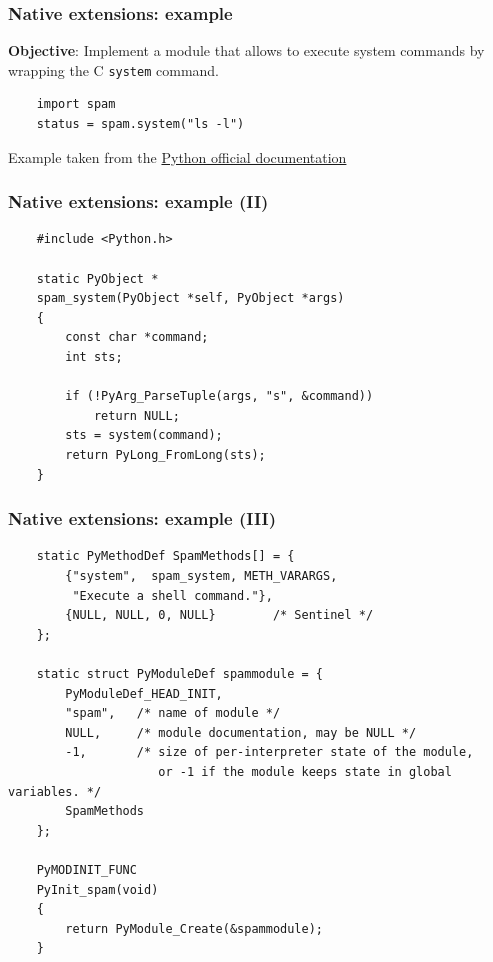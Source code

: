 \documentclass{beamer}
\begin{document}
\begin{frame}[fragile]
  \frametitle{Native extensions: example}

  \textbf{Objective}: Implement a module that allows to execute system commands
  by wrapping the C \texttt{system} command.

  \begin{verbatim}
    import spam
    status = spam.system("ls -l")
  \end{verbatim}

  \tiny Example taken from the
  \href{https://docs.python.org/3/extending/extending.html#a-simple-example}{Python
  official documentation}
\end{frame}

\begin{frame}[fragile]
  \frametitle{Native extensions: example (II)}

  \begin{verbatim}
    #include <Python.h>

    static PyObject *
    spam_system(PyObject *self, PyObject *args)
    {
        const char *command;
        int sts;

        if (!PyArg_ParseTuple(args, "s", &command))
            return NULL;
        sts = system(command);
        return PyLong_FromLong(sts);
    }
  \end{verbatim}
\end{frame}

\begin{frame}[fragile]
  \frametitle{Native extensions: example (III)}

  \begin{verbatim}
    static PyMethodDef SpamMethods[] = {
        {"system",  spam_system, METH_VARARGS,
         "Execute a shell command."},
        {NULL, NULL, 0, NULL}        /* Sentinel */
    };

    static struct PyModuleDef spammodule = {
        PyModuleDef_HEAD_INIT,
        "spam",   /* name of module */
        NULL,     /* module documentation, may be NULL */
        -1,       /* size of per-interpreter state of the module,
                     or -1 if the module keeps state in global variables. */
        SpamMethods
    };

    PyMODINIT_FUNC
    PyInit_spam(void)
    {
        return PyModule_Create(&spammodule);
    }
  \end{verbatim}
\end{frame}
\end{document}
